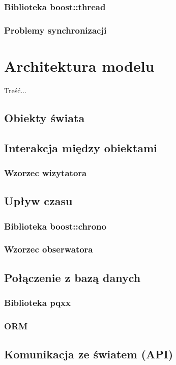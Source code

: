 \subsubsection{Biblioteka boost::thread}
\subsubsection{Problemy synchronizacji}

\section[Architektura modelu][Architektura modelu]{Architektura modelu}
\par{ Treść... }
\subsection{Obiekty świata}
\subsection{Interakcja między obiektami}
\subsubsection{Wzorzec wizytatora}
\subsection{Upływ czasu}
\subsubsection{Biblioteka boost::chrono}
\subsubsection{Wzorzec obserwatora}
\subsection{Połączenie z bazą danych}
\subsubsection{Biblioteka pqxx}
\subsubsection{ORM}
\subsection{Komunikacja ze światem (API)}
